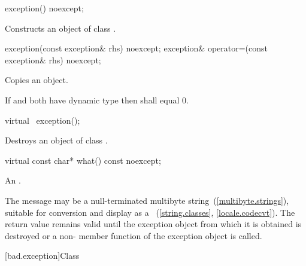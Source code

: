 %
\begin{itemdecl}
exception() noexcept;
\end{itemdecl}

\begin{itemdescr}
\pnum
\effects
Constructs an object of class
.
\end{itemdescr}

%
\begin{itemdecl}
exception(const exception& rhs) noexcept;
exception& operator=(const exception& rhs) noexcept;
\end{itemdecl}

\begin{itemdescr}
\pnum
\effects
Copies an
object.

\pnum
\postcondition If  and  both have dynamic type 
then  shall equal 0.
\end{itemdescr}

%
%
\begin{itemdecl}
virtual ~exception();
\end{itemdecl}

\begin{itemdescr}
\pnum
\effects
Destroys an object of class
.
\end{itemdescr}

%
\begin{itemdecl}
virtual const char* what() const noexcept;
\end{itemdecl}

\begin{itemdescr}
\pnum
\returns
{}%
An  \ntbs.

\pnum
\notes
The message may be a null-terminated multibyte string~(\ref{multibyte.strings}),
suitable for conversion and display as a
~(\ref{string.classes}, \ref{locale.codecvt}).
The return value remains valid until the exception object from which
it is obtained is destroyed or a non-
member function of the exception object is called.
\end{itemdescr}

[bad.exception]{Class }

